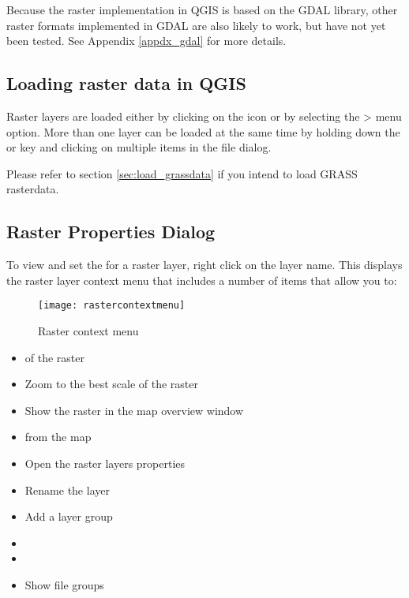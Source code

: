 Because the raster implementation in QGIS is based on the GDAL library, other
raster formats implemented in GDAL are also likely to work, but have not yet
been tested. See Appendix \ref{appdx_gdal} for more
details.
	
\subsection{Loading raster data in QGIS}\label{label_loadraster}

Raster layers are loaded either by clicking on the 
 icon or by
selecting the > menu option. More than one 
layer can be loaded at the same time by holding down the
 or  key
and clicking on multiple items in the file dialog.

Please refer to section \ref{sec:load_grassdata} if you intend to load GRASS rasterdata.
	
\subsection{Raster Properties Dialog}\label{label_rasterprop}

To view and set the  for a raster layer, right click on the layer
name. This displays the raster layer context menu that includes a number of
items that allow you to:

\begin{figure}[ht]
   \begin{center}
   \caption{Raster context menu}\label{fig:raster_contextmenu}\smallskip
   \texttt{[image: rastercontextmenu]}
\end{center}  
\end{figure}

\begin{itemize}
\item {} of the raster
\item Zoom to the best scale of the raster
\item Show the raster in the map overview window
\item {} from the map
\item Open the raster layers properties
\item Rename the layer
\item Add a layer group
\item {}
\item {}
\item Show file groups
\end{itemize}

